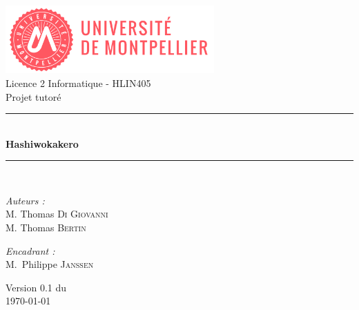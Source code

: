 \documentclass[a4paper,12pt]{book}
\makeatletter
\def\cleardoublepage{\clearpage\if@twoside \ifodd\c@page\else%
  \hbox{}
  \thispagestyle{empty}
  
  \if@twocolumn\hbox{}\newpage\fi\fi\fi}
\makeatother
\begin{document}
\begin{titlepage}
\begin{center}

\includegraphics[width=0.6\textwidth]{logo_univ2}\\[1cm]

{\large Licence 2 Informatique - HLIN405}\\[0.5cm]

{\large Projet tutoré}\\[0.5cm]

\rule{\linewidth}{0.5mm} \\[0.4cm]
{ \huge \bfseries Hashiwokakero \\[0.4cm] }
\rule{\linewidth}{0.5mm} \\[1.5cm]

\noindent
\begin{minipage}{0.4\textwidth}
  \begin{flushleft} \large
    \emph{Auteurs :} \\
    M. Thomas \textsc{Di Giovanni} \\
    M. Thomas \textsc{Bertin} \\
  \end{flushleft}
\end{minipage}
\begin{minipage}{0.4\textwidth}
  \begin{flushright} \large
    \emph{Encadrant :} \\
    M.~Philippe \textsc{Janssen} \\
  \end{flushright}
\end{minipage}

\vfill

{\large Version 0.1 du \\ \today}

\end{center}
\end{titlepage}

\tableofcontents
\clearpage

\mainmatter
\pagestyle{fancy}

\cleardoublepage







\appendix
\nocite{*}



\clearpage
\end{document}
